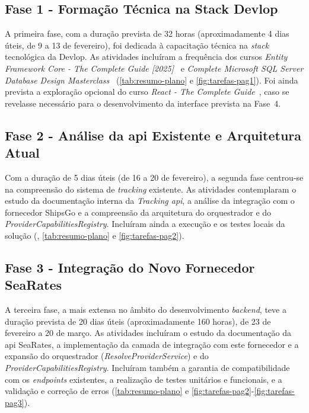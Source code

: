 \subsection{Fase 1 - Formação Técnica na Stack Devlop}

A primeira fase, com a duração prevista de 32 horas (aproximadamente 4 dias úteis, de 9 a 13 de fevereiro), foi dedicada à capacitação técnica na \textit{stack} tecnológica da Devlop. As atividades incluíram a frequência dos cursos \textit{Entity Framework Core - The Complete Guide [2025]}~\cite{efcore-course} e \textit{Complete Microsoft SQL Server Database Design Masterclass}~\cite{sqlserver-course} (\autoref{tab:resumo-plano} e \autoref{fig:tarefas-pag1}). Foi ainda prevista a exploração opcional do curso \textit{React - The Complete Guide}~\cite{react-course}, caso se revelasse necessário para o desenvolvimento da interface prevista na Fase~4.

\subsection[Fase 2 - Análise da API Existente e Arquitetura Atual]{Fase 2 - Análise da \gls{api} Existente e Arquitetura Atual}

Com a duração de 5 dias úteis (de 16 a 20 de fevereiro), a segunda fase centrou-se na compreensão do sistema de \textit{tracking} existente. As atividades contemplaram o estudo da documentação interna da \textit{Tracking \gls{api}}, a análise da integração com o fornecedor ShipsGo e a compreensão da arquitetura do orquestrador e do \textit{ProviderCapabilitiesRegistry}. Incluíram ainda a execução e os testes locais da solução (, \autoref{tab:resumo-plano} e \autoref{fig:tarefas-pag2}).

\subsection{Fase 3 - Integração do Novo Fornecedor SeaRates}

A terceira fase, a mais extensa no âmbito do desenvolvimento \textit{backend}, teve a duração prevista de 20 dias úteis (aproximadamente 160 horas), de 23 de fevereiro a 20 de março. As atividades incluíram o estudo da documentação da \gls{api} SeaRates, a implementação da camada de integração com este fornecedor e a expansão do orquestrador (\textit{ResolveProviderService}) e do \textit{ProviderCapabilitiesRegistry}. Incluíram também a garantia de compatibilidade com os \textit{endpoints} existentes, a realização de testes unitários e funcionais, e a validação e correção de erros (\autoref{tab:resumo-plano} e \autoref{fig:tarefas-pag2}-\autoref{fig:tarefas-pag3}).

